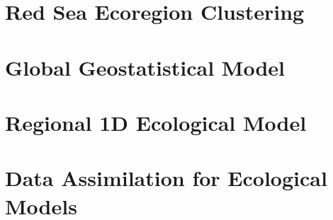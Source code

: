 \section{Red Sea Ecoregion Clustering}

\section{Global Geostatistical Model}

\section{Regional 1D Ecological Model}

\section{Data Assimilation for Ecological Models}

